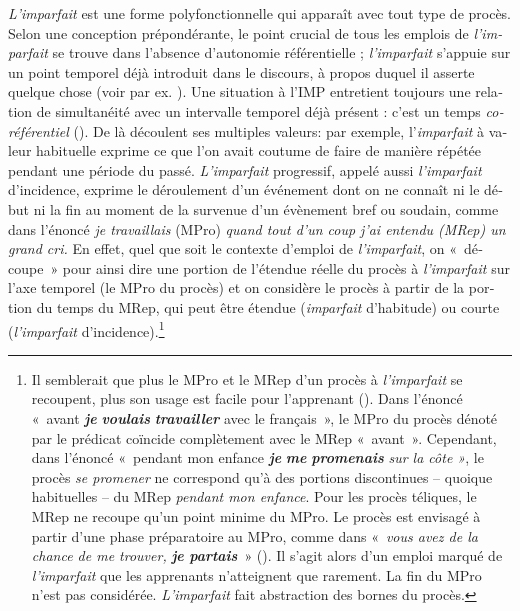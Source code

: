 \documentclass[french, output=paper]{langscibook}
\begin{document}
\begin{otherlanguage}{french}
\textit{L’imparfait} est une forme polyfonctionnelle qui apparaît avec tout type de procès. Selon une conception prépondérante, le point crucial de tous les emplois de \textit{l’imparfait} se trouve dans l’absence d’autonomie référentielle ; \textit{l’imparfait} s’appuie sur un point temporel déjà introduit dans le discours, à propos duquel il asserte quelque chose (voir par ex. \citealt{KleinLi2009}). Une situation à l’IMP entretient toujours une relation de simultanéité avec un intervalle temporel déjà présent : c’est un temps \textit{coréférentiel} (\citealt{Molendijk1990, CombettesEtAl1993, Wetters1996}). De là découlent ses multiples valeurs: par exemple, l’\textit{imparfait} à valeur habituelle exprime ce que l’on avait coutume de faire de manière répétée pendant une période du passé. \textit{L’imparfait} progressif, appelé aussi \textit{l’imparfait} d’incidence, exprime le déroulement d’un événement dont on ne connaît ni le début ni la fin au moment de la survenue d’un évènement bref ou soudain, comme dans l’énoncé \textit{je travaillais} (MPro) \textit{quand tout d’un coup j’ai entendu (MRep) un grand cri.} En effet, quel que soit le contexte d’emploi de \textit{l’imparfait}, on «~découpe~» pour ainsi dire une portion de l’étendue réelle du procès à \textit{l’imparfait} sur l’axe temporel (le MPro du procès) et on considère le procès à partir de la portion du temps du MRep, qui peut être étendue (\textit{imparfait} d’habitude) ou courte (\textit{l’imparfait} d’incidence).\footnote{Il semblerait que plus le MPro et le MRep d’un procès à \textit{l’imparfait} se recoupent, plus son usage est facile pour l’apprenant (\cites[]{Kihlstedt2002}[79--81]{Kihlstedt2013}[]{IzquierdoKihlstedt2019}). Dans l'énoncé «~avant \textbf{\textit{je}} \textbf{\textit{voulais}} \textbf{\textit{travailler}} avec le français~», le MPro du procès dénoté par le prédicat coïncide complètement avec le MRep «~avant~». Cependant, dans l’énoncé «~pendant mon enfance \textbf{\textit{je}} \textbf{\textit{me}} \textbf{\textit{promenais}} \textit{sur la côte »}, le procès \textit{se promener} ne correspond qu’à des portions discontinues – quoique habituelles – du MRep \textit{pendant mon enfance}. Pour les procès téliques, le MRep ne recoupe qu’un point minime du MPro. Le procès est envisagé à partir d’une phase préparatoire au MPro, comme dans «~\textit{vous avez de la chance de me trouver,} \textbf{\textit{je} \textit{partais}}~» (\citealt[92]{Imbs1960}). Il s’agit alors d’un emploi marqué de \textit{l’imparfait} que les apprenants n’atteignent que rarement. La fin du MPro n’est pas considérée. \textit{L’imparfait} fait abstraction des bornes du procès.}



\end{otherlanguage}
\end{document}
